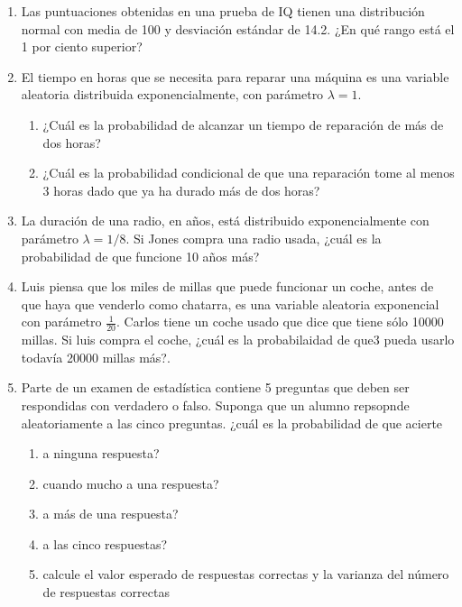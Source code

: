 \begin{Ejer}
\begin{enumerate}
\begin{enumerate}
\item más de 10 años?
\item menos de 5 años?
\item entre 5 y 10 años?
\end{enumerate}

\item Las puntuaciones obtenidas en una prueba de IQ tienen una distribución normal con media de 100 y desviación estándar de 14.2. ¿En qué rango está el 1 por ciento superior?

\item El tiempo en horas que se necesita para reparar una máquina es una variable aleatoria distribuida exponencialmente, con parámetro $\lambda=1$.
\begin{enumerate}
\item ¿Cuál es la probabilidad de alcanzar un tiempo de reparación de más de dos horas?
\item ¿Cuál es la probabilidad condicional de que una reparación tome al menos 3 horas dado que ya ha durado más de dos horas?
\end{enumerate}

\item La duración de una radio, en años, está distribuido exponencialmente con parámetro $\lambda=1/8$. Si Jones compra una radio usada, ¿cuál es la probabilidad de que funcione 10 años más?

\item Luis piensa que los miles de millas que puede funcionar un coche, antes de que haya que venderlo como chatarra, es una variable aleatoria exponencial con parámetro $\frac{1}{20}$. Carlos tiene un coche usado que dice que tiene sólo 10000 millas. Si luis compra el coche, ¿cuál es la probabilaidad de que3 pueda usarlo todavía 20000 millas más?.

\item Parte de un examen de estadística contiene 5 preguntas que deben ser respondidas con verdadero o falso. Suponga que un alumno repsopnde aleatoriamente a las cinco preguntas. ¿cuál es la probabilidad de que acierte
\begin{enumerate}
\item a ninguna respuesta?
\item cuando mucho a una respuesta?
\item a más de una respuesta?
\item a las cinco respuestas?
\item calcule el valor esperado de respuestas correctas y la varianza del número de respuestas correctas
\end{enumerate}


\end{enumerate}
\end{Ejer}
